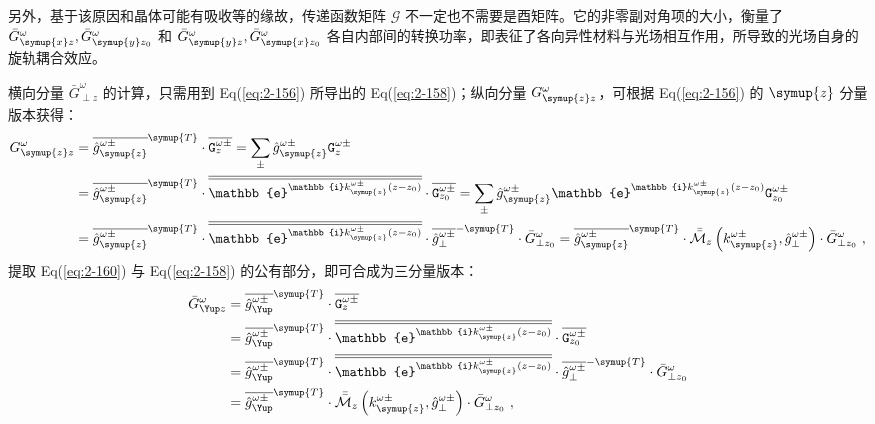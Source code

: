 另外，基于该原因和晶体可能有吸收等的缘故，传递函数矩阵 $\mathcal{G}$ 不一定也不需要是酉矩阵。它的非零副对角项的大小，衡量了 $\bar{G}^{\omega}_{\symup{x} z}, \bar{G}^{\omega}_{\symup{y} z_0}$ 和 $\bar{G}^{\omega}_{\symup{y} z}, \bar{G}^{\omega}_{\symup{x} z_0}$ 各自内部间的转换功率，即表征了各向异性材料与光场相互作用，所导致的光场自身的旋轨耦合效应。

横向分量 $\bar{G}^{\omega}_{\perp z}$ 的计算，只需用到 Eq(\ref{eq:2-156}) 所导出的 Eq(\ref{eq:2-158})；纵向分量 $G^{\omega}_{\symup{z}z}$，可根据 Eq(\ref{eq:2-156}) 的 $\symup{z}$ 分量版本获得：
\begin{subequations} \label{eq:2-160}
	\abovedisplayskip=10pt
	\belowdisplayskip=10pt
	\begin{align}
		G^{\omega}_{\symup{z}z} &= \overline{\hat{g}^{\omega\pm}_{\symup{z}}}^{\symup{T}} \cdot \overline{{\mathtt{G}}^{\omega\pm}_{z}} = \sum_{\pm} \hat{g}^{\omega\pm}_{\symup{z}} {\mathtt{G}}^{\omega\pm}_{z} \label{eq:2-160a}\\ &= \overline{\hat{g}^{\omega\pm}_{\symup{z}}}^{\symup{T}} \cdot \overline{\overline{\mathbb{e}^{ \mathbb{i} k^{\omega\pm}_{\symup{z}} \left( z - z_0 \right)}}} \cdot \overline{{\mathtt{G}}^{\omega\pm}_{z_0}} = \sum_{\pm} \hat{g}^{\omega\pm}_{\symup{z}} \mathbb{e}^{ \mathbb{i} k^{\omega\pm}_{\symup{z}} \left( z - z_0 \right)} {\mathtt{G}}^{\omega\pm}_{z_0} \label{eq:2-160b}\\&= \overline{\hat{g}^{\omega\pm}_{\symup{z}}}^{\symup{T}} \cdot \overline{\overline{\mathbb{e}^{ \mathbb{i} k^{\omega\pm}_{\symup{z}} \left( z - z_0 \right)}}} \cdot \overline{\hat{g}^{\omega\pm}_{\perp}}^{-\symup{T}} \cdot \bar{G}^{\omega}_{\perp z_0} = \overline{\hat{g}^{\omega\pm}_{\symup{z}}}^{\symup{T}} \cdot \bar{\bar{\mathcal{M}}}_z \left( k^{\omega\pm}_{\symup{z}}, \hat{g}^{\omega\pm}_{\perp} \right) \cdot \bar{G}^{\omega}_{\perp z_0} \label{eq:2-160c}~,
	\end{align}
\end{subequations}
提取 Eq(\ref{eq:2-160}) 与 Eq(\ref{eq:2-158}) 的公有部分，即可合成为三分量版本：
\begin{subequations} \label{eq:2-161}
	\abovedisplayskip=10pt
	\belowdisplayskip=10pt
	\begin{align}
		\bar{G}^{\omega}_{\Yup z} &= \overline{\hat{g}^{\omega\pm}_{\Yup}}^{\symup{T}} \cdot \overline{{\mathtt{G}}^{\omega\pm}_{z}} \label{eq:2-161a}\\ &= \overline{\hat{g}^{\omega\pm}_{\Yup}}^{\symup{T}} \cdot \overline{\overline{\mathbb{e}^{ \mathbb{i} k^{\omega\pm}_{\symup{z}} \left( z - z_0 \right)}}} \cdot \overline{{\mathtt{G}}^{\omega\pm}_{z_0}} \label{eq:2-161b}\\&= \overline{\hat{g}^{\omega\pm}_{\Yup}}^{\symup{T}} \cdot \overline{\overline{\mathbb{e}^{ \mathbb{i} k^{\omega\pm}_{\symup{z}} \left( z - z_0 \right)}}} \cdot \overline{\hat{g}^{\omega\pm}_{\perp}}^{-\symup{T}} \cdot \bar{G}^{\omega}_{\perp z_0} \label{eq:2-161c}\\&= \overline{\hat{g}^{\omega\pm}_{\Yup}}^{\symup{T}} \cdot \bar{\bar{\mathcal{M}}}_z \left( k^{\omega\pm}_{\symup{z}}, \hat{g}^{\omega\pm}_{\perp} \right) \cdot \bar{G}^{\omega}_{\perp z_0} \label{eq:2-161d}~,
	\end{align}
\end{subequations}
